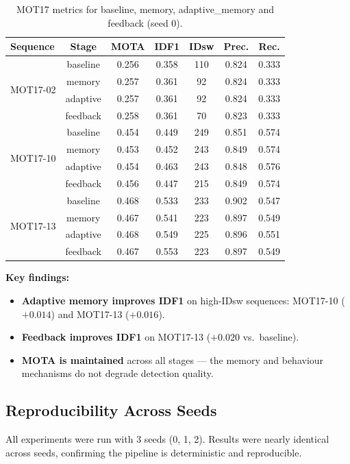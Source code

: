 \documentclass[11pt,a4paper]{article}
\begin{document}
\begin{table}[H]
\centering
\caption{MOT17 metrics for baseline, memory, adaptive\_memory and feedback (seed 0).}
\label{tab:mot17_metrics}
\begin{tabular}{@{}lcccccc@{}}
\toprule
\textbf{Sequence} & \textbf{Stage} & \textbf{MOTA} & \textbf{IDF1} & \textbf{IDsw} & \textbf{Prec.} & \textbf{Rec.} \\
\midrule
\multirow{4}{*}{MOT17-02} & baseline & 0.256 & 0.358 & 110 & 0.824 & 0.333 \\
 & memory & 0.257 & 0.361 & 92 & 0.824 & 0.333 \\
 & adaptive & 0.257 & 0.361 & 92 & 0.824 & 0.333 \\
 & feedback & 0.258 & 0.361 & 70 & 0.823 & 0.333 \\
\midrule
\multirow{4}{*}{MOT17-10} & baseline & 0.454 & 0.449 & 249 & 0.851 & 0.574 \\
 & memory & 0.453 & 0.452 & 243 & 0.849 & 0.574 \\
 & adaptive & 0.454 & 0.463 & 243 & 0.848 & 0.576 \\
 & feedback & 0.456 & 0.447 & 215 & 0.849 & 0.574 \\
\midrule
\multirow{4}{*}{MOT17-13} & baseline & 0.468 & 0.533 & 233 & 0.902 & 0.547 \\
 & memory & 0.467 & 0.541 & 223 & 0.897 & 0.549 \\
 & adaptive & 0.468 & 0.549 & 225 & 0.896 & 0.551 \\
 & feedback & 0.467 & 0.553 & 223 & 0.897 & 0.549 \\
\bottomrule
\end{tabular}
\end{table}

\textbf{Key findings:}
\begin{itemize}[leftmargin=2em]
    \item \textbf{Adaptive memory improves IDF1} on high-IDsw sequences: MOT17-10 ($+0.014$) and MOT17-13 ($+0.016$).
    \item \textbf{Feedback improves IDF1} on MOT17-13 ($+0.020$ vs.\ baseline).
    \item \textbf{MOTA is maintained} across all stages --- the memory and behaviour mechanisms do not degrade detection quality.
\end{itemize}

\subsection{Reproducibility Across Seeds}
All experiments were run with 3 seeds (0, 1, 2). Results were nearly identical across seeds, confirming the pipeline is deterministic and reproducible.
\end{document}

